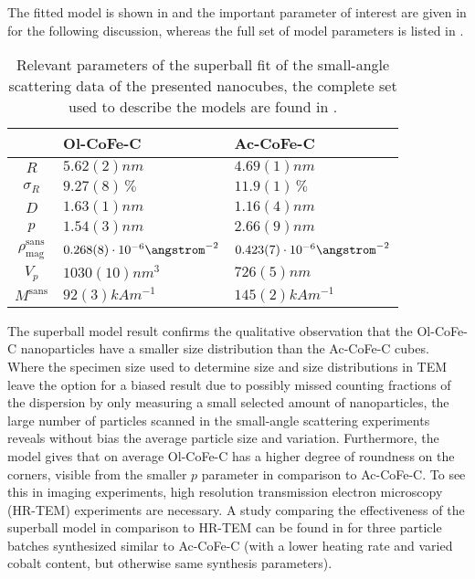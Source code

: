 \documentclass[\main/dresen_thesis.tex]{subfiles}
\begin{document}
    The fitted model is shown in  and the important parameter of interest are given in  for the following discussion, whereas the full set of model parameters is listed in .
    \begin{table}[ht]
      \centering
      \caption{\label{tab:monolayers:nanoparticle:sas}Relevant parameters of the superball fit of the small-angle scattering data of the presented nanocubes, the complete set used to describe the models are found in .}
      \begin{tabular}{ c | l | l }
          & Ol-CoFe-C & Ac-CoFe-C \\
        \hline
        $R$
          & $5.62(2) \unit{nm}$
          & $4.69(1) \unit{nm}$\\
        $\sigma_R$
          & $9.27(8) \,\%$
          & $11.9(1) \,\%$\\
        $D$
          & $1.63(1) \unit{nm}$
          & $1.16(4) \unit{nm}$\\
        $p$
          & $1.54(3) \unit{nm}$
          & $2.66(9) \unit{nm}$\\
        $\rho_\mathrm{mag}^\mathrm{sans}$
          & $0.268(8) \cdot 10^{-6} \angstrom^{-2}$
          & $0.423(7) \cdot 10^{-6} \angstrom^{-2}$\\
        \hline
        $V_p$
          & $1030(10) \unit{nm^3}$
          & $726(5) \unit{nm}$\\
        $M^\mathrm{sans}$
          & $92(3) \unit{kAm^{-1}}$
          & $145(2) \unit{kAm^{-1}}$\\
        \hline
      \end{tabular}
    \end{table}
    The superball model result confirms the qualitative observation that the Ol-CoFe-C nanoparticles have a smaller size distribution than the Ac-CoFe-C cubes.
    Where the specimen size used to determine size and size distributions in TEM leave the option for a biased result due to possibly missed counting fractions of the dispersion by only measuring a small selected amount of nanoparticles, the large number of particles scanned in the small-angle scattering experiments reveals without bias the average particle size and variation.
    Furthermore, the model gives that on average Ol-CoFe-C has a higher degree of roundness on the corners, visible from the smaller $p$ parameter in comparison to Ac-CoFe-C.
    To see this in imaging experiments, high resolution transmission electron microscopy (HR-TEM) experiments are necessary.
    A study comparing the effectiveness of the superball model in comparison to HR-TEM can be found in  for three particle batches synthesized similar to Ac-CoFe-C (with a lower heating rate and varied cobalt content, but otherwise same synthesis parameters).
\end{document}
